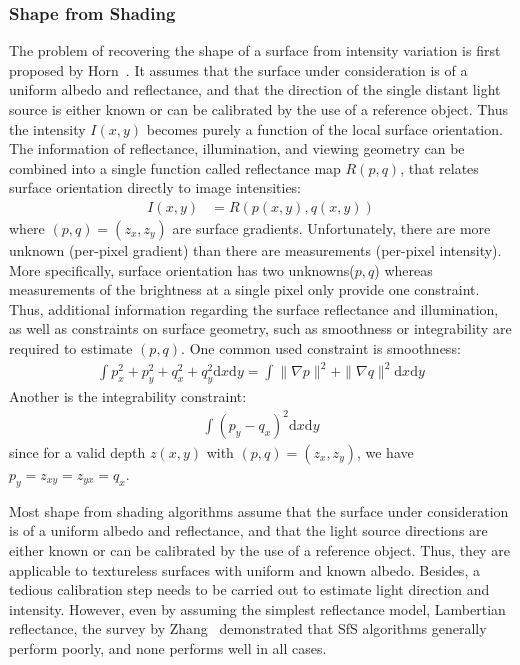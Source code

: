 \subsubsection{Shape from Shading}
The problem of recovering the shape of a surface from intensity variation is first proposed by Horn~\cite{horn1970shape}. It assumes that the surface under consideration is of a uniform albedo and reflectance, and that the direction of the single distant light source is either known or can be calibrated by the use of a reference object. Thus the intensity $I(x,y)$ becomes purely a function of the local surface orientation. The information of reflectance, illumination, and viewing geometry can be combined into a single function called reflectance map $R(p, q)$, that relates surface orientation directly to image intensities:
\begin{align*}
I(x, y) &= R(p(x, y), q(x, y))
\end{align*}
where $(p, q) = (z_x, z_y)$ are surface gradients. Unfortunately, there are more unknown (per-pixel gradient) than there are measurements (per-pixel intensity). More specifically, surface orientation has two unknowns($p, q$) whereas measurements of the brightness at a single pixel only provide one constraint. Thus, additional information regarding the surface reflectance and illumination, as well as constraints on surface geometry, such as smoothness or integrability are required to estimate $(p, q)$. One common used constraint is smoothness:
\begin{align*}
\int p_x^2 + p_y^2 + q_x^2 + q_y^2 \mathrm{d}x\mathrm{d}y = \int \|\nabla p\|^2+\|\nabla q\|^2 \mathrm{d}x\mathrm{d}y
\end{align*}
Another is the integrability constraint:
\begin{align*}
\int(p_y-q_x)^2 \mathrm{d}x\mathrm{d}y
\end{align*}
since for a valid depth $z(x, y)$ with $(p, q)=(z_x, z_y)$, we have $p_y=z_{xy}=z_{yx}=q_x$.


Most shape from shading algorithms assume that the surface under consideration is of a uniform albedo and reflectance, and that the light source directions are either known or can be calibrated by the use of a reference object. Thus, they are applicable to textureless surfaces with uniform and known albedo. Besides, a tedious calibration step needs to be carried out to estimate light direction and intensity. However, even by assuming the simplest reflectance model, Lambertian reflectance, the survey by Zhang~\cite{zhang1999shape} demonstrated that SfS algorithms generally perform poorly, and none performs well in all cases.

